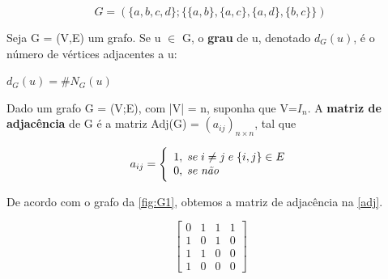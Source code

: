 \begin{equation}
    G = (\{a,b,c,d\}; \{\{a,b\},\{a,c\},\{a,d\}, \{b,c\}\})
\end{equation}

\begin{definition}
Seja G = (V,E) um grafo. Se u $\in$ G, o \textbf{grau} de u, denotado $d_G(u)$, é o número de vértices adjacentes a u: 
\begin{center}
$d_G(u) = \#N_G(u)$
\end{center}
\end{definition}

\begin{definition}
Dado um grafo G = (V;E), com |V| = n, suponha que V=$I_n$. A \textbf{matriz de adjacência} de G é a matriz Adj(G) = $(a_{ij})_{n\times n}$, tal que
\begin{center}
\begin{equation*}
a_{ij}= \Bigg{\{} \begin{array}{ll} 1, \; se \; i\neq j  \; e \; \{i,j\} \in E \\ 0, \; se \; \textit{não} \end{array}
\end{equation*}
\end{center}
\end{definition}

De acordo com o grafo da \autoref{fig:G1}, obtemos a matriz de adjacência na \autoref{adj}.

\begin{equation}
\label{adj}
    \begin{bmatrix}
       0 & 1 & 1 & 1 \\
       1 & 0 & 1 & 0 \\
       1 & 1 & 0 & 0 \\
       1 & 0 & 0 & 0 
    \end{bmatrix}
\end{equation}